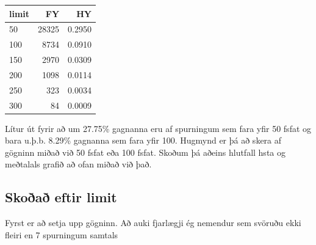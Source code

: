 \documentclass[
]{article}
\newenvironment{Shaded}{\begin{snugshade}}{\end{snugshade}}
\newcommand{\DataTypeTok}[1]{\textcolor[rgb]{0.13,0.29,0.53}{#1}}
\newcommand{\DecValTok}[1]{\textcolor[rgb]{0.00,0.00,0.81}{#1}}
\newcommand{\KeywordTok}[1]{\textcolor[rgb]{0.13,0.29,0.53}{\textbf{#1}}}
\newcommand{\NormalTok}[1]{#1}
\newcommand{\OperatorTok}[1]{\textcolor[rgb]{0.81,0.36,0.00}{\textbf{#1}}}
\newcommand{\StringTok}[1]{\textcolor[rgb]{0.31,0.60,0.02}{#1}}
\begin{document}
\begin{Shaded}
\begin{Highlighting}[]
{{{{{\NormalTok{FHbylim }\OperatorTok{%
\end{Highlighting}
\end{Shaded}

\begin{tabular}{l|r|r}
\hline
limit & FY & HY\\
\hline
50 & 28325 & 0.2950\\
\hline
100 & 8734 & 0.0910\\
\hline
150 & 2970 & 0.0309\\
\hline
200 & 1098 & 0.0114\\
\hline
250 & 323 & 0.0034\\
\hline
300 & 84 & 0.0009\\
\hline
\end{tabular}

Lítur út fyrir að um 27.75\% gagnanna eru af spurningum sem fara yfir 50 fsfat og bara u.þ.b. 8.29\% gagnanna sem fara yfir 100. Hugmynd er þá að skera af gögninn miðað við 50 fsfat eða 100 fsfat. Skoðum þá aðeins hlutfall hsta og meðtalals grafið að ofan miðað við það.

\hypertarget{skouxf0auxf0-eftir-limit}{%
\subsection{Skoðað eftir limit}\label{skouxf0auxf0-eftir-limit}}

Fyrst er að setja upp gögninn. Að auki fjarlægji ég nemendur sem svöruðu ekki fleiri en 7 spurningum samtals

\begin{Shaded}
\end{Shaded}
\end{document}
